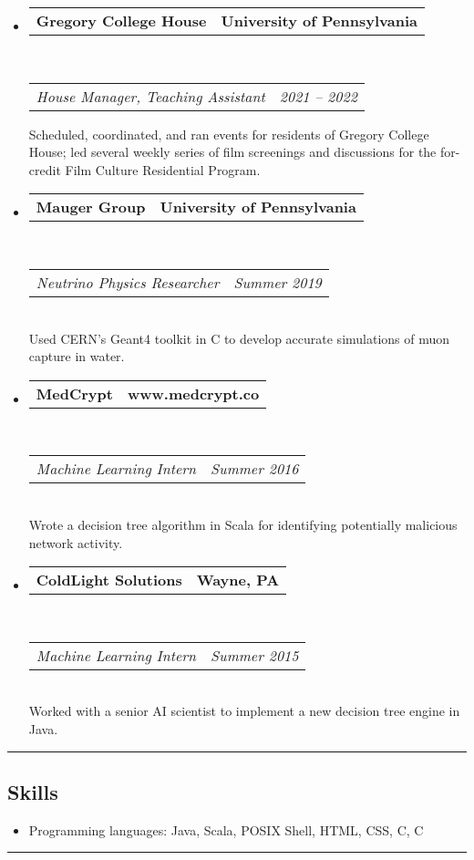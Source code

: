 \documentclass[11pt,letterpaper]{article}
\makeatletter
\newcommand{\headerrow}[2]
{\begin{tabular*}{\linewidth}{l@{\extracolsep{\fill}}r}
	#1 &
	#2 \\
\end{tabular*}}
\newcommand{\CPP}
{C\nolinebreak[4]\hspace{-.05em}\raisebox{.22ex}{\footnotesize\bf ++}}
\makeatother
\begin{document}
\begin{itemize}
	\parskip=0.1em

	\item
	\headerrow
		{\bfseries Gregory College House}
		{\bfseries University of Pennsylvania}
	\\
	\headerrow
		{\em House Manager, Teaching Assistant}
		{\em 2021 -- 2022}
	Scheduled, coordinated, and ran events for residents of Gregory College House;
	led several weekly series of film screenings and discussions for the for-credit Film Culture Residential Program.

	\item
	\headerrow
		{\bfseries Mauger Group}
		{\bfseries University of Pennsylvania}
	\\
	\headerrow
		{\em Neutrino Physics Researcher}
		{\em Summer 2019}
	\\
	Used CERN's Geant4 toolkit in \CPP{} to develop accurate simulations of muon capture in water.

	\item
	\headerrow
		{\bfseries MedCrypt}
		{\bfseries www.medcrypt.co}
	\\
	\headerrow
		{\em Machine Learning Intern}
		{\em Summer 2016}
	\\
	Wrote a decision tree algorithm in Scala for identifying potentially malicious network activity.

	\item
	\headerrow
		{\bfseries ColdLight Solutions}
		{\bfseries Wayne, PA}
	\\
	\headerrow
		{\em Machine Learning Intern}
		{\em Summer 2015}
	\\
	Worked with a senior AI scientist to implement a new decision tree engine in Java.

\end{itemize}

\hrule
\vspace{-0.4em}
\subsection*{Skills}

\begin{itemize}

	\item[]
	Programming languages: Java, Scala, POSIX Shell, HTML, CSS, C, \CPP{}

\end{itemize}

\hrule
\vspace{-0.4em}
\end{document}
